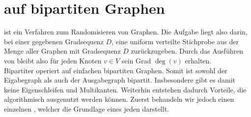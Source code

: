
\section{\gc{} auf bipartiten Graphen}
\label{sec:global_curveball}
\gc{} ist ein Verfahren zum Randomisieren von Graphen.
Die Aufgabe liegt also darin, bei einer gegebenen Gradsequenz $D$, eine uniform verteilte Stichprobe
aus der Menge aller Graphen mit Gradsequenz $D$ zurückzugeben. Durch das Ausführen von \gc{} 
bleibt also für jeden Knoten $v\in V$ sein Grad $\deg(v)$ erhalten. 
\\

Bipartiter \gc{} operiert auf einfachen bipartiten Graphen. Somit ist sowohl der Eigabegraph als auch
der Ausgabegraph bipartit. Insbesondere gibt es damit keine Eigenschleifen und Multikanten.
Weiterhin entstehen dadurch 
Vorteile, die algorithmisch ausgenutzt werden können. Zuerst behandeln wir jedoch einen einzelnen \cb{}, welcher
die Grundlage eines jeden \gc{} darstellt.
\\

